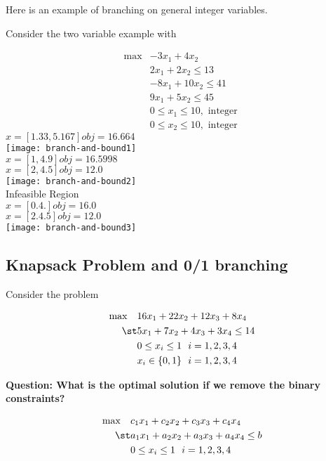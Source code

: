 \documentclass[../open-optimization/open-optimization.tex]{subfiles}
\begin{document}
Here is an example of branching on general integer variables.

\begin{example}{}{}
Consider the two variable example with
 
 \begin{align*}
 \max & -3x_1 + 4x_2\\
 & 2x_1 + 2 x_2 \leq 13\\
 & -8 x_1 + 10x_2 \leq 41\\
 & 9x_1 + 5x_2 \leq 45\\
 & 0 \leq x_1 \leq 10, \text{ integer }\\
 & 0 \leq x_2 \leq 10, \text{ integer }
 \end{align*}
$x =  [1.33, 5.167]  obj =  16.664$\\
\noindent \texttt{[image: branch-and-bound1]}\\
$x =  [1,  4.9]  obj =  16.5998$\\
$x =  [2,  4.5]  obj =  12.0$\\
\texttt{[image: branch-and-bound2]}\\
Infeasible Region\\
$x =  [0. 4.]  obj =  16.0$\\
$x =  [2.  4.5]  obj =  12.0$\\
\texttt{[image: branch-and-bound3]}\\

\end{example}



\subsection{Knapsack Problem  and 0/1 branching}

Consider the problem 

\begin{align*}
\max \quad & 16x_1 + 22x_2 + 12x_3 + 8 x_4\\
\st & 5x_1 + 7x_2 + 4x_3 + 3x_4 \leq 14\\
& 0 \leq x_i \leq 1 \ \ i=1,2,3,4\\
& x_i \in \{0,1\} \ \ i=1,2,3,4
\end{align*}

\textbf{Question: What is the optimal solution if we remove the binary constraints?}




\begin{align*}
\max \quad & c_1 x_1 + c_2 x_2 + c_3 x_3 + c_4 x_4\\
\st & a_1 x_1 + a_2 x_2 + a_3 x_3 + a_4 x_4 \leq b\\
& 0 \leq x_i \leq 1 \ \ i=1,2,3,4\\
\end{align*}
\end{document}
